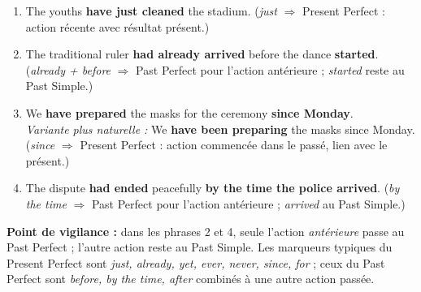 \documentclass[11pt]{article}
\begin{document}
\begin{corrige}

\begin{enumerate}
\item The youths \textbf{have just cleaned} the stadium. (\emph{just} $\Rightarrow$ Present Perfect : action récente avec résultat présent.)

\item The traditional ruler \textbf{had already arrived} before the dance \textbf{started}. (\emph{already + before} $\Rightarrow$ Past Perfect pour l'action antérieure ; \emph{started} reste au Past Simple.)

\item We \textbf{have prepared} the masks for the ceremony \textbf{since Monday}. \\
\emph{Variante plus naturelle :} We \textbf{have been preparing} the masks since Monday. (\emph{since} $\Rightarrow$ Present Perfect : action commencée dans le passé, lien avec le présent.)

\item The dispute \textbf{had ended} peacefully \textbf{by the time the police arrived}. (\emph{by the time} $\Rightarrow$ Past Perfect pour l'action antérieure ; \emph{arrived} au Past Simple.)
\end{enumerate}

\textbf{Point de vigilance :} dans les phrases 2 et 4, seule l'action \emph{antérieure} passe au Past Perfect ; l'autre action reste au Past Simple. Les marqueurs typiques du Present Perfect sont \emph{just, already, yet, ever, never, since, for} ; ceux du Past Perfect sont \emph{before, by the time, after} combinés à une autre action passée.
\end{corrige}
\end{document}
